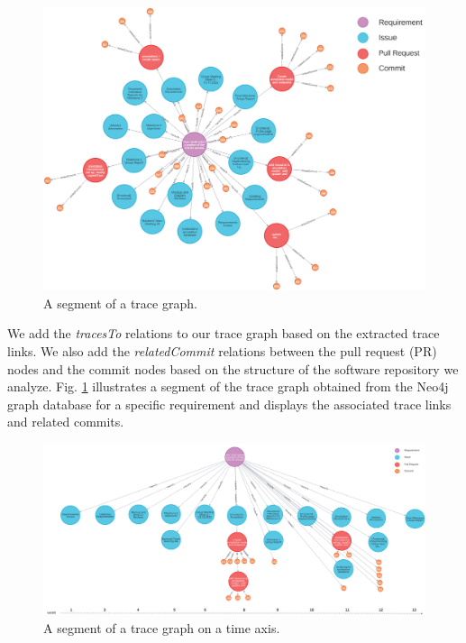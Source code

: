 \begin{figure}[htb]
    \centering
    \includegraphics[width=1\linewidth]{figs/rawTraceGraph.png}
    \caption{A segment of a trace graph.}
    \label{fig:rawtracegraph}
  \end{figure}

  We add the \emph{tracesTo} relations to our trace graph based on the extracted trace links. We also add the \emph{relatedCommit} relations between the pull request (PR) nodes and the commit nodes based on the structure of the software repository we analyze. Fig. \ref{fig:rawtracegraph} illustrates a segment of the trace graph obtained from the Neo4j graph database for a specific requirement and displays the associated trace links and related commits.

\begin{figure}[htb]
    \centering
    \includegraphics[width=.99\linewidth]{figs/traceGraph.png}
    \caption{A segment of a trace graph on a time axis.}
    \label{fig:tracegraph}
\end{figure}

